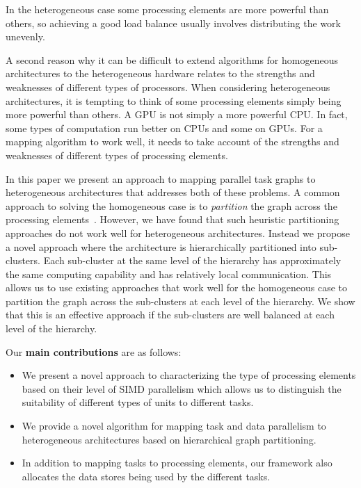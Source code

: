 In the heterogeneous case some processing elements are more powerful
than others, so achieving a good load balance usually involves
distributing the work unevenly. %

A second reason why it can be difficult to extend algorithms for
homogeneous architectures to the heterogeneous hardware relates to the
strengths and weaknesses of different types of processors. When
considering heterogeneous architectures, it is tempting to think of
some processing elements simply being more powerful than others. %
A GPU is not simply a more powerful CPU. In fact, some types of
computation run better on CPUs and some on GPUs.  For a mapping
algorithm to work well, it needs to take account of the strengths and
weaknesses of different types of processing elements.

In this paper we present an approach to mapping parallel task graphs to
heterogeneous architectures that addresses both of these problems.  A
common approach to solving the homogeneous case is to \textit{partition}
the graph across the processing elements~\cite{aale01,kpur99,enys98}.
However, we have found that such heuristic partitioning approaches do
not work well for heterogeneous architectures. Instead we propose a
novel approach where the architecture is hierarchically partitioned into
sub-clusters.  Each sub-cluster at the same level of the hierarchy has
approximately the same computing capability and has relatively local
communication.  This allows us to use existing approaches that work well
for the homogeneous case to partition the graph across the sub-clusters
at each level of the hierarchy. We show that this is an effective
approach if the sub-clusters are well balanced at each level of the
hierarchy.

Our \textbf{main contributions} are as follows:
\begin{itemize}
\item We present a novel approach to characterizing the type of
  processing elements based on their level of SIMD parallelism which
  allows us to distinguish the suitability of different types of units
  to different tasks.
\item We provide a novel algorithm for mapping task and data parallelism
  to heterogeneous architectures based on hierarchical graph
  partitioning.
\item In addition to mapping tasks to processing elements, our framework
  also allocates the data stores being used by the different tasks.
\end{itemize}

